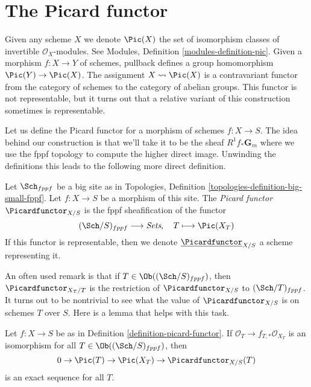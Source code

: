 \section{The Picard functor}
\label{section-picard-functor}

\noindent
Given any scheme $X$ we denote $\Pic(X)$ the set of isomorphism
classes of invertible $\mathcal{O}_X$-modules.
See Modules, Definition \ref{modules-definition-pic}.
Given a morphism $f : X \to Y$ of schemes, pullback defines
a group homomorphism $\Pic(Y) \to \Pic(X)$.
The assignment
$X \leadsto \Pic(X)$ is a contravariant functor from the category
of schemes to the category of abelian groups. This functor is not
representable, but it turns out that a relative variant of this
construction sometimes is representable.

\medskip\noindent
Let us define the Picard functor for a morphism of schemes $f : X \to S$.
The idea behind our construction is that we'll take it to be the sheaf
$R^1f_*\mathbf{G}_m$ where we use the fppf topology to compute the higher
direct image. Unwinding the definitions this leads to the following more
direct definition.

\begin{definition}
\label{definition-picard-functor}
Let $\Sch_{fppf}$ be a big site as in
Topologies, Definition \ref{topologies-definition-big-small-fppf}.
Let $f : X \to S$ be a morphism of this site. The {\it Picard functor}
$\Picardfunctor_{X/S}$ is the fppf sheafification of the functor
$$
(\Sch/S)_{fppf} \longrightarrow \textit{Sets},\quad
T \longmapsto \Pic(X_T)
$$
If this functor is representable, then we denote
$\underline{\Picardfunctor}_{X/S}$ a scheme representing it.
\end{definition}

\noindent
An often used remark is that if $T \in \Ob((\Sch/S)_{fppf})$, then
$\Picardfunctor_{X_T/T}$ is the restriction of $\Picardfunctor_{X/S}$ to
$(\Sch/T)_{fppf}$.
It turns out to be nontrivial to see what the value of $\Picardfunctor_{X/S}$
is on schemes $T$ over $S$. Here is a lemma that helps with this
task.

\begin{lemma}
\label{lemma-flat-geometrically-connected-fibres}
Let $f : X \to S$ be as in Definition \ref{definition-picard-functor}.
If $\mathcal{O}_T \to f_{T, *}\mathcal{O}_{X_T}$ is an isomorphism
for all $T \in \Ob((\Sch/S)_{fppf})$, then
$$
0 \to \Pic(T) \to \Pic(X_T) \to \Picardfunctor_{X/S}(T)
$$
is an exact sequence for all $T$.
\end{lemma}

